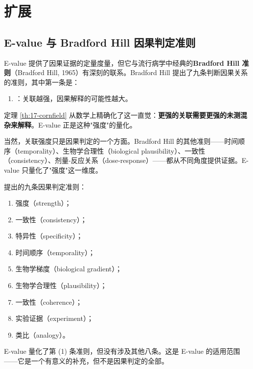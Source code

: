 \section{扩展}\label{sec:17-extensions}

\subsection{E-value 与 Bradford Hill 因果判定准则}\label{sec:17-bradford-hill}

E-value 提供了因果证据的定量度量，但它与流行病学中经典的\textbf{Bradford Hill 准则}（Bradford Hill, 1965）有深刻的联系。Bradford Hill 提出了九条判断因果关系的准则，其中第一条是：

\begin{enumerate}
  \item[\textbf{强度（Strength）}]：关联越强，因果解释的可能性越大。
\end{enumerate}

定理 \ref{th:17-cornfield} 从数学上精确化了这一直觉：\textbf{更强的关联需要更强的未测混杂来解释}。E-value 正是这种"强度"的量化。

当然，关联强度只是因果判定的一个方面。Bradford Hill 的其他准则——时间顺序（temporality）、生物学合理性（biological plausibility）、一致性（consistency）、剂量-反应关系（dose-response）——都从不同角度提供证据。E-value 只量化了"强度"这一维度。

\begin{Definition}\label{def:17-bradford-hill}
\citep{BradfordHill1965} 提出的九条因果判定准则：
\begin{enumerate}
  \item 强度（strength）；
  \item 一致性（consistency）；
  \item 特异性（specificity）；
  \item 时间顺序（temporality）；
  \item 生物学梯度（biological gradient）；
  \item 生物学合理性（plausibility）；
  \item 一致性（coherence）；
  \item 实验证据（experiment）；
  \item 类比（analogy）。
\end{enumerate}
\end{Definition}

E-value 量化了第 (1) 条准则，但没有涉及其他八条。这是 E-value 的适用范围——它是一个有意义的补充，但不是因果判定的全部。

